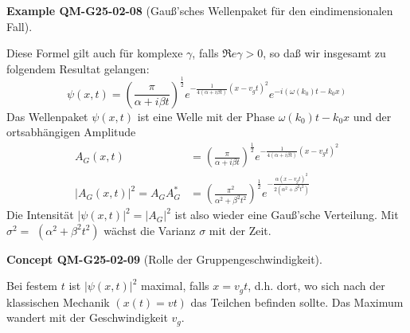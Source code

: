 \documentclass[10pt, letterpaper]{article}
\newcommand{\CustomHeading}[3]{%
  \par\medskip\noindent%
  \textbf{#1 #2} \textnormal{(#3)}.\enskip%
}
\newenvironment{EXA}[2]{\CustomHeading{Example}{#1}{#2}}{}
\newenvironment{CONC}[2]{\CustomHeading{Concept}{#1}{#2}}{}
\begin{document}
\begin{EXA}{QM-G25-02-08}{Gauß'sches Wellenpaket für den eindimensionalen Fall}
Diese Formel gilt auch für komplexe $\gamma$, falls $\Re e \gamma>0$, so daß wir insgesamt zu folgendem Resultat gelangen:
$$
\psi(x, t)=\left(\frac{\pi}{\alpha+i \beta t}\right)^{\frac{1}{2}} e^{-\frac{1}{4(\alpha+i \beta t)}\left(x-v_{g} t\right)^{2}} e^{-i\left(\omega\left(k_{0}\right) t-k_{0} x\right)}
$$
Das Wellenpaket $\psi(x, t)$ ist eine Welle mit der Phase $\omega\left(k_{0}\right) t-k_{0} x$ und der ortsabhängigen Amplitude
$$
\begin{aligned}
A_{G}(x, t) & =\left(\frac{\pi}{\alpha+i \beta t}\right)^{\frac{1}{2}} e^{-\frac{1}{4(\alpha+i \beta t)}\left(x-v_{g} t\right)^{2}} \\
\left|A_{G}(x, t)\right|^{2}=A_{G} A_{G}^{*} & =\left(\frac{\pi^{2}}{\alpha^{2}+\beta^{2} t^{2}}\right)^{\frac{1}{2}} e^{-\frac{\alpha\left(x-v_{g} t\right)^{2}}{2\left(\alpha^{2}+\beta^{2} t^{2}\right)}}
\end{aligned}
$$
Die Intensität $|\psi(x, t)|^{2}=\left|A_{G}\right|^{2}$ ist also wieder eine Gauß'sche Verteilung. Mit $\sigma^{2}=$ $\left(\alpha^{2}+\beta^{2} t^{2}\right)$ wächst die Varianz $\sigma$ mit der Zeit.
\end{EXA}

\begin{CONC}{QM-G25-02-09}{Rolle der Gruppengeschwindigkeit}
Bei festem $t$ ist $|\psi(x, t)|^{2}$ maximal, falls $x=v_{g} t$, d.h. dort, wo sich nach der klassischen Mechanik $(x(t)=v t)$ das Teilchen befinden sollte. Das Maximum wandert mit der Geschwindigkeit $v_{g}$.
\end{CONC}
\end{document}
